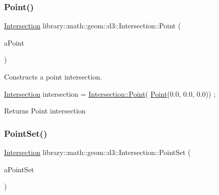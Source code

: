 \subsubsection{\texorpdfstring{Point()}{Point()}}
{\footnotesize\ttfamily \hyperlink{classlibrary_1_1math_1_1geom_1_1d3_1_1_intersection}{Intersection} library\+::math\+::geom\+::d3\+::\+Intersection\+::\+Point (\begin{DoxyParamCaption}\item[{const \hyperlink{classlibrary_1_1math_1_1geom_1_1d3_1_1objects_1_1_point}{objects\+::\+Point} \&}]{a\+Point }\end{DoxyParamCaption})\hspace{0.3cm}{\ttfamily [static]}}



Constructs a point intersection. 


\begin{DoxyCode}
\hyperlink{classlibrary_1_1math_1_1geom_1_1d3_1_1_intersection_afbaef540a058ccc7e58f1be2585304a9}{Intersection} intersection = \hyperlink{classlibrary_1_1math_1_1geom_1_1d3_1_1_intersection_a5155cc245bd2bf96a4296b0a8319c709}{Intersection::Point}(
      \hyperlink{classlibrary_1_1math_1_1geom_1_1d3_1_1_intersection_a5155cc245bd2bf96a4296b0a8319c709}{Point}(0.0, 0.0, 0.0)) ;
\end{DoxyCode}


\begin{DoxyReturn}{Returns}
Point intersection 
\end{DoxyReturn}
\mbox{\label{classlibrary_1_1math_1_1geom_1_1d3_1_1_intersection_a562d64d802f6fcd181f1122393642605}} 
\subsubsection{\texorpdfstring{Point\+Set()}{PointSet()}}
{\footnotesize\ttfamily \hyperlink{classlibrary_1_1math_1_1geom_1_1d3_1_1_intersection}{Intersection} library\+::math\+::geom\+::d3\+::\+Intersection\+::\+Point\+Set (\begin{DoxyParamCaption}\item[{const \hyperlink{classlibrary_1_1math_1_1geom_1_1d3_1_1objects_1_1_point_set}{objects\+::\+Point\+Set} \&}]{a\+Point\+Set }\end{DoxyParamCaption})\hspace{0.3cm}{\ttfamily [static]}}



